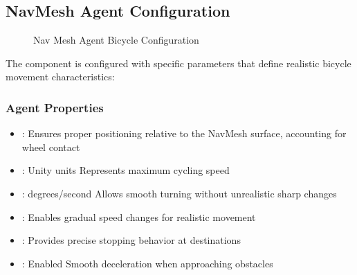 \documentclass[letterpaper,10pt,english]{jupyterBook}
\begin{document}
\subsection{NavMesh Agent Configuration}
\label{\detokenize{Bicycle Agent:navmesh-agent-configuration}}
\begin{figure}[htbp]
\centering
\capstart

\noindent{}
\caption{Nav Mesh Agent \sphinxhyphen{} Bicycle Configuration}\label{\detokenize{Bicycle Agent:id1}}\end{figure}

\sphinxAtStartPar
The  component is configured with specific parameters that define realistic bicycle movement characteristics:


\subsubsection{Agent Properties}
\label{\detokenize{Bicycle Agent:agent-properties}}\begin{itemize}
\item {} 
\sphinxAtStartPar
{}:  \sphinxhyphen{} Ensures proper positioning relative to the NavMesh surface, accounting for wheel contact

\item {} 
\sphinxAtStartPar
{}:  Unity units \sphinxhyphen{} Represents maximum cycling speed

\item {} 
\sphinxAtStartPar
{}:  degrees/second \sphinxhyphen{} Allows smooth turning without unrealistic sharp changes

\item {} 
\sphinxAtStartPar
{}:  \sphinxhyphen{} Enables gradual speed changes for realistic movement

\item {} 
\sphinxAtStartPar
{}:  \sphinxhyphen{} Provides precise stopping behavior at destinations

\item {} 
\sphinxAtStartPar
{}: Enabled \sphinxhyphen{} Smooth deceleration when approaching obstacles

\end{itemize}
\end{document}
